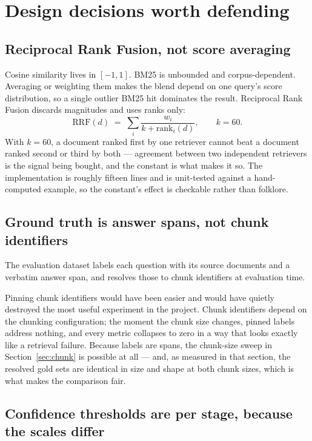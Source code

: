 \documentclass[11pt,a4paper]{article}
\begin{document}
\section{Design decisions worth defending}

\subsection{Reciprocal Rank Fusion, not score averaging}

Cosine similarity lives in $[-1, 1]$. BM25 is unbounded and corpus-dependent.
Averaging or weighting them makes the blend depend on one query's score
distribution, so a single outlier BM25 hit dominates the result. Reciprocal Rank
Fusion discards magnitudes and uses ranks only:
\[
  \mathrm{RRF}(d) \;=\; \sum_i \frac{w_i}{k + \mathrm{rank}_i(d)}, \qquad k = 60 .
\]
With $k = 60$, a document ranked first by one retriever cannot beat a document
ranked second or third by both --- agreement between two independent retrievers
is the signal being bought, and the constant is what makes it so. The
implementation is roughly fifteen lines and is unit-tested against a
hand-computed example, so the constant's effect is checkable rather than
folklore.

\subsection{Ground truth is answer spans, not chunk identifiers}

The evaluation dataset labels each question with its source documents and a
verbatim answer span, and resolves those to chunk identifiers at evaluation time.

Pinning chunk identifiers would have been easier and would have quietly destroyed
the most useful experiment in the project. Chunk identifiers depend on the
chunking configuration; the moment the chunk size changes, pinned labels address
nothing, and every metric collapses to zero in a way that looks exactly like a
retrieval failure. Because labels are spans, the chunk-size sweep in
Section~\ref{sec:chunk} is possible at all --- and, as measured in that section,
the resolved gold sets are identical in size and shape at both chunk sizes, which
is what makes the comparison fair.

\subsection{Confidence thresholds are per stage, because the scales differ}
\end{document}
